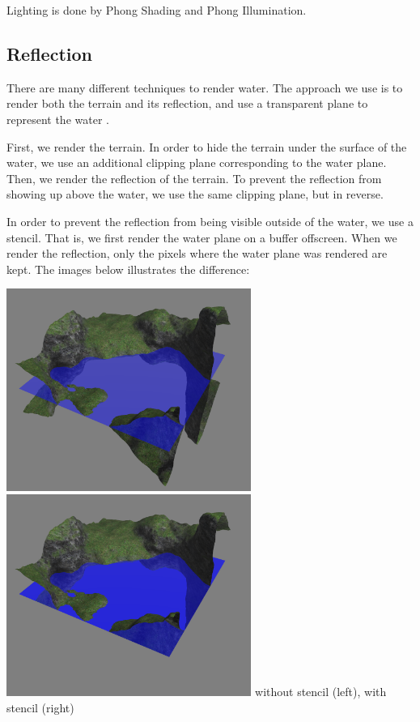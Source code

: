 \documentclass {article}
\begin{document}
Lighting is done by Phong Shading and Phong Illumination.

\subsection{Reflection}

There are many different techniques to render water. The approach we use is to render both the terrain and its reflection, and use a transparent plane to represent the water \cite{Luna:2012:IGP:2341371}.

First, we render the terrain. In order to hide the terrain under the surface of the water, we use an additional clipping plane corresponding to the water plane. Then, we render the reflection of the terrain. To prevent the reflection from showing up above the water, we use the same clipping plane, but in reverse.

In order to prevent the reflection from being visible outside of the water, we use a stencil. That is, we first render the water plane on a buffer offscreen. When we render the reflection, only the pixels where the water plane was rendered are kept. The images below illustrates the difference:

\begin{center}
    \includegraphics[width=8cm]{withoutstencil.png}
    \includegraphics[width=8cm]{withstencil.png}
    without stencil (left), with stencil (right)
\end{center}
\end{document}

